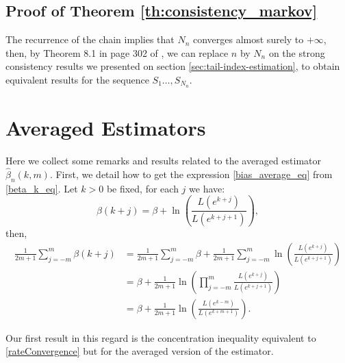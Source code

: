 \documentclass[sn-mathphys-ay]{sn-jnl}%
\begin{document}
\begin{appendices}
\subsection{Proof of Theorem \ref{th:consistency_markov}}

The recurrence of the chain implies that \(N_n\) converges almost surely to
\(+\infty\), then, by Theorem 8.1 in page 302 of \cite{Gut2013}, we can replace \(n\)
by \(N_n\) on the strong consistency results we presented on section
\ref{sec:tail-index-estimation}, to obtain equivalent results for the sequence
\(S_1\ldots,S_{N_n}\).

\section{Averaged Estimators}\label{subsec:ave}

Here we collect some remarks and results related to the averaged estimator $\widehat
    \beta_n \left( {k,m} \right)$. First, we detail how to get the expression
\eqref{bias_average_eq} from \eqref{beta_k_eq}. Let \(k>0\) be fixed, for each $j$ we
have:
\begin{equation*}
    \beta \left( {k + j} \right) = \beta  + \ln \left( {\frac{{L\left( {{e^{k + j}}} \right)}}{{L\left( {{e^{k + j + 1}}} \right)}}} \right),
\end{equation*}
then,
\begin{align*}
    \frac{1}{{2m + 1}}\sum\limits_{j =  - m}^m {\beta \left( {k + j} \right)} & = \frac{1}{{2m + 1}}\sum\limits_{j =  - m}^m \beta   + \frac{1}{{2m + 1}}\sum\limits_{j =  - m}^m {\ln \left( {\frac{{L\left( {{e^{k + j}}} \right)}}{{L\left( {{e^{k + j + 1}}} \right)}}} \right)} \\                                             & = \beta+\frac{1}{{2m + 1}}\ln \left( {\prod\limits_{j =  - m}^m {\frac{{L\left( {{e^{k + j}}} \right)}}{{L\left( {{e^{k + j + 1}}} \right)}}} } \right)                                              \\
                                                                              & = \beta + \frac{1}{{2m + 1}}\ln \left( {\frac{{L\left( {{e^{k - m}}} \right)}}{{L\left( {{e^{k + m + 1}}} \right)}}} \right).
\end{align*}

Our first result in this regard is the concentration inequality equivalent to
\eqref{rateConvergence} but for the averaged version of the estimator.


\end{appendices}
\end{document}
